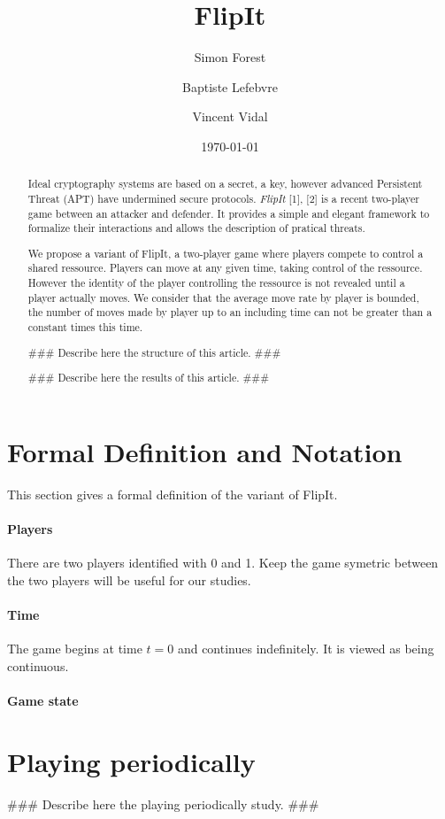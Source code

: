 \documentclass[a4paper]{article}
\title{FlipIt}
\author{Simon Forest \and Baptiste Lefebvre \and Vincent Vidal}
\date{\today}
\begin{document}
\maketitle

\begin{abstract}
Ideal cryptography systems are based on a secret, a key, however advanced Persistent
Threat (APT) have undermined secure protocols. \emph{FlipIt} [1], [2] is a recent
two-player game between an attacker and defender. It provides a simple and elegant
framework to formalize their interactions and allows the description of pratical
threats.

We propose a variant of FlipIt, a two-player game where players compete to control
a shared ressource. Players can move at any given time, taking control of the
ressource. However the identity of the player controlling the ressource is not
revealed until a player actually moves. We consider that the average move rate by
player is bounded, the number of moves made by player up to an including time can
not be greater than a constant times this time.

\#\#\# Describe here the structure of this article. \#\#\#

\#\#\# Describe here the results of this article. \#\#\#
\end{abstract}

\section{Formal Definition and Notation}
This section gives a formal definition of the variant of FlipIt.

\paragraph{Players}
There are two players identified with 0 and 1. Keep the game symetric between the
two players will be useful for our studies.

\paragraph{Time}
The game begins at time \(t = 0\) and continues indefinitely. It is viewed as being
continuous.

\paragraph{Game state}

\section{Playing periodically}
\#\#\# Describe here the playing periodically study. \#\#\#
\end{document}
